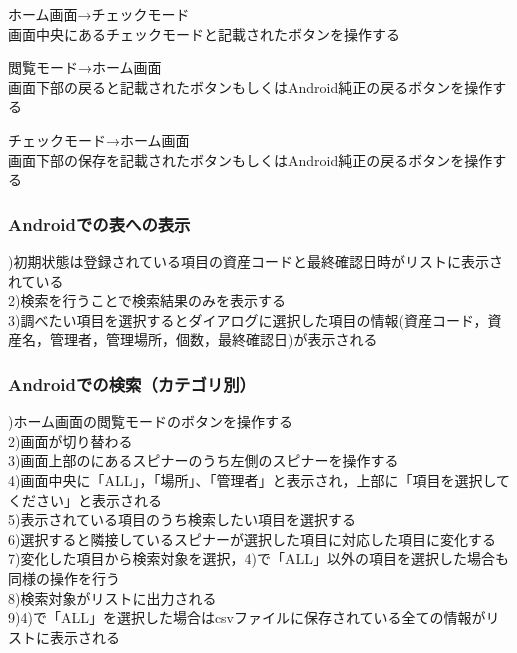 \documentclass[11pt,a4j]{jarticle}
\begin{document}
\noindent
{ホーム画面→チェックモード}
\\画面中央にあるチェックモードと記載されたボタンを操作する

\noindent
{閲覧モード→ホーム画面}
\\画面下部の戻ると記載されたボタンもしくはAndroid純正の戻るボタンを操作する

\noindent
{チェックモード→ホーム画面}
\\画面下部の保存を記載されたボタンもしくはAndroid純正の戻るボタンを操作する
\subsubsection{Androidでの表への表示}
)初期状態は登録されている項目の資産コードと最終確認日時がリストに表示されている
\\2)検索を行うことで検索結果のみを表示する
\\3)調べたい項目を選択するとダイアログに選択した項目の情報(資産コード，資産名，管理者，管理場所，個数，最終確認日)が表示される

\subsubsection{Androidでの検索（カテゴリ別）}
)ホーム画面の閲覧モードのボタンを操作する
\\2)画面が切り替わる
\\3)画面上部のにあるスピナーのうち左側のスピナーを操作する
\\4)画面中央に「ALL」，「場所」、「管理者」と表示され，上部に「項目を選択してください」と表示される
\\5)表示されている項目のうち検索したい項目を選択する
\\6)選択すると隣接しているスピナーが選択した項目に対応した項目に変化する
\\7)変化した項目から検索対象を選択，4)で「ALL」以外の項目を選択した場合も同様の操作を行う
\\8)検索対象がリストに出力される
\\9)4)で「ALL」を選択した場合はcsvファイルに保存されている全ての情報がリストに表示される
\end{document}

